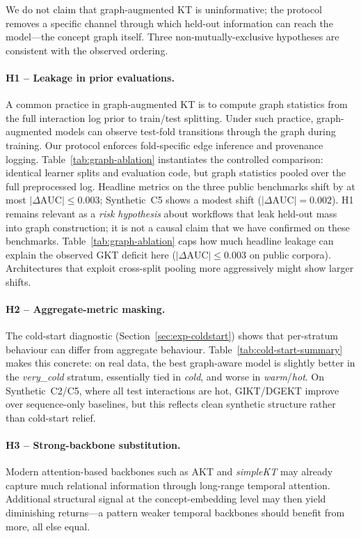 \documentclass[pdflatex,sn-mathphys-num]{sn-jnl}
\begin{document}
We do not claim that graph-augmented KT is uninformative; the protocol
removes a specific channel through which held-out information can reach the
model---the concept graph itself. Three non-mutually-exclusive hypotheses
are consistent with the observed ordering.

\paragraph{H1 -- Leakage in prior evaluations.}
A common practice in graph-augmented KT is to compute graph statistics
from the full interaction log prior to train/test splitting. Under such
practice, graph-augmented models can observe test-fold transitions through
the graph during training. Our protocol enforces fold-specific edge
inference and provenance logging. Table~\ref{tab:graph-ablation}
instantiates the controlled comparison: identical learner splits and
evaluation code, but graph statistics pooled over the full preprocessed log.
Headline metrics on the three public benchmarks shift by at most
$|\Delta\text{AUC}|{\leq}0.003$; Synthetic~C5 shows a modest shift
($|\Delta\text{AUC}|{=}0.002$). H1 remains relevant as a \emph{risk hypothesis} about workflows that leak
held-out mass into graph construction; it is not a causal claim that we have
confirmed on these benchmarks. Table~\ref{tab:graph-ablation} caps how much
headline leakage can explain the observed GKT deficit here
($|\Delta\text{AUC}|{\leq}0.003$ on public corpora). Architectures that exploit
cross-split pooling more aggressively might show larger shifts.

\paragraph{H2 -- Aggregate-metric masking.}
The cold-start diagnostic (Section~\ref{sec:exp-coldstart}) shows that
per-stratum behaviour can differ from aggregate behaviour.
Table~\ref{tab:cold-start-summary} makes this concrete: on real data, the
best graph-aware model is slightly better in the \emph{very\_cold} stratum,
essentially tied in \emph{cold}, and worse in \emph{warm}/\emph{hot}. On
Synthetic~C2/C5, where all test interactions are hot, GIKT/DGEKT improve over
sequence-only baselines, but this reflects clean synthetic structure rather
than cold-start relief.

\paragraph{H3 -- Strong-backbone substitution.}
Modern attention-based backbones such as AKT and \textit{simpleKT} may
already capture much relational information through long-range temporal
attention. Additional structural signal at the concept-embedding level may
then yield diminishing returns---a pattern weaker temporal backbones should
benefit from more, all else equal.
\end{document}
